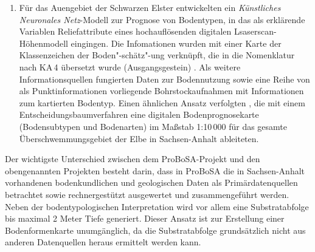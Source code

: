 \begin{enumerate}
\citet{geoflux_MoellerKoschitzki2007lagb} erarbeiteten ein Regelwerk zur reliefbezogenen Plau"-si"-bi"-li"-täts"-über"-prüfung der Vorläufigen Bodenkundlichen Karte 1:50\,000 (VBK\,50). Die Regeln wurden in Form von Fuzzylogik-Zugehörigkeitsfunktionen erstellt, die auf Reliefattribute angewendet worden sind \citep{Hartmann2014}. Eine Weiterentwicklung des Ansatzes stellt der in \citet{Moeller-etal2012catena} vorgestellte Algorithmus dar, der die expertenbasierte Auswahl von Schwellenwerten durch Clusteranalyse und den Vergleich von Summenkurven spezifischer Reliefmerkmale unterstützt.

\item Für das Auengebiet der Schwarzen Elster entwickelten \citet{BehrensScholten2003b} ein \textit{Künstliches Neuronales Netz}-Modell zur Prognose von Bodentypen, in das als erklärende Variablen Reliefattribute eines hochauflösenden digitalen Lsaserscan-Höhenmodell eingingen. Die Infomationen wurden mit einer Karte der Klassenzeichen der Boden"-schätz"-ung verknüpft, die in die Nomenklatur nach KA\,4 übersetzt wurde (Ausgangsgestein) \citep{NBIS2003}. Als weitere Informationsquellen fungierten Daten zur Bodennutzung sowie eine Reihe von als Punktinformationen vorliegende Bohrstockaufnahmen mit Informationen zum kartierten Bodentyp. Einen ähnlichen Ansatz verfolgten \citet{geoflux_Moeller-etal2009lau}, die mit einem Entscheidungsbaumverfahren eine digitalen Bodenprognosekarte (Bodensubtypen und Bodenarten) im Maßstab 1:10\,000 für das gesamte Überschwemmungsgebiet der Elbe in Sachsen-Anhalt ableiteten.
\end{enumerate}



Der wichtigste Unterschied zwischen dem ProBoSA-Projekt und den obengenannten Projekten besteht darin, dass in ProBoSA die in Sachsen-Anhalt vorhandenen bodenkundlichen und geologischen Daten als Primärdatenquellen betrachtet sowie rechnergestützt ausgewertet und zusammengeführt werden. Neben der bodentypologischen Interpretation wird vor allem eine Substratabfolge bis maximal 2 Meter Tiefe generiert. Dieser Ansatz ist zur Erstellung einer Bodenformenkarte unumgänglich, da die Substratabfolge grundsätzlich nicht aus anderen Datenquellen heraus ermittelt werden kann. 

